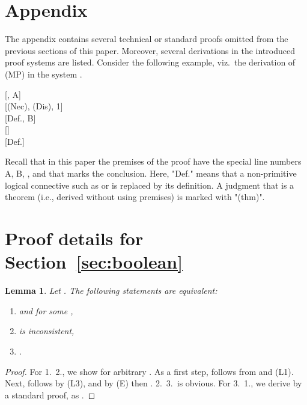 \documentclass[a4paper,english,fleqn,11pt,final]{scrartcl}
\makeatletter
\newcommand{\ie}{i.e.\@\xspace}
\newcommand{\negg}{{\sim}}
\newcommand{\limp}{\multimap}
\newcommand{\timp}{\rightarrowtriangle}
\newcommand{\tens}{\otimes}
\newcommand{\Deriv}[1]{{\normalfont\textsf{#1}}}
\theoremstyle{plain}
\newtheorem{lemma}[theorem]{Lemma}
\theoremstyle{definition}
\newcommand{\thm}{\text{\scriptsize\; (thm)}}
\makeatother
\begin{document}
\printbibliography

\clearpage

\appendix

\renewcommand*{\thesection}{\Alph{section}}



\section*{Appendix}

The appendix contains several technical or standard proofs omitted from the previous sections of this paper.
Moreover, several derivations in the introduced proof systems are listed.
Consider the following example, viz.\ the derivation of \Deriv{(MP)} in the system .

\medskip

{
\setlength{\fitchprfwidth}{2.2in}
\fitchprf{
\pline[A ]{\varphi \timp \psi \thm} \\
\pline[B ]{\vartheta \tens \varphi}
}
{
\pline[1 ]{\negg \psi \timp \negg \varphi \thm }[, A]\\
\pline[2 ]{(\vartheta\limp\negg\psi)\timp(\vartheta \limp \negg\varphi) \thm}[\Deriv{(Nec)}, \Deriv{(Dis)}, 1]\\
\pline[3 ]{\negg(\vartheta \limp \negg \varphi)}[Def., B]\\
\pline[4 ]{\negg(\vartheta\limp\negg\psi)}[]\\
\pline[\slider]{\vartheta \tens \psi}[Def.]
}
}

\medskip


Recall that in this paper the premises of the proof have the special line numbers A, B, \textellipsis, and that \slider marks the conclusion.
Here, "Def." means that a non-primitive logical connective such as  or  is replaced by its definition.
A judgment that is a theorem (\ie, derived without using premises) is marked with "{\scriptsize(thm)}".

\section{Proof details for Section~\ref{sec:boolean}}

\begin{lemma}\label{lem:derive-contradiction}
Let . The following statements are equivalent:
\begin{enumerate}
	\item  and  for some ,
	\item  is inconsistent,
	\item .
\end{enumerate}
\end{lemma}
\begin{proof}
For 1.\  2., we show  for arbitrary .
As a first step,  follows from  and \Deriv{(L1)}.
Next,  follows by \Deriv{(L3)}, and by  \Deriv{(E)} then .
2.\  3.\ is obvious.
For 3.\  1., we derive  by a standard proof, as .
\end{proof}
\end{document}

